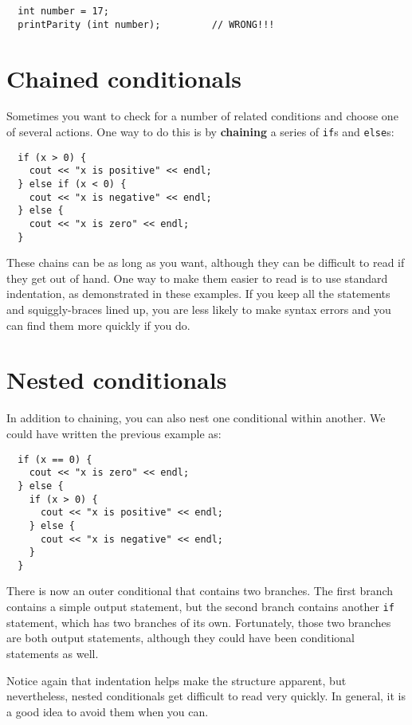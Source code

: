 \begin{verbatim}
  int number = 17;
  printParity (int number);         // WRONG!!!
\end{verbatim}

\section {Chained conditionals}

Sometimes you want to check for a number of related conditions
and choose one of several actions.  One way to do this is by
{\bf chaining} a series of {\tt if}s and {\tt else}s:

\begin{verbatim}
  if (x > 0) {
    cout << "x is positive" << endl;
  } else if (x < 0) {
    cout << "x is negative" << endl;
  } else {
    cout << "x is zero" << endl;
  }
\end{verbatim}
%
These chains can be as long as you want, although they can
be difficult to read if they get out of hand.  One way to
make them easier to read is to use standard indentation,
as demonstrated in these examples.  If you keep all the
statements and squiggly-braces lined up, you are less
likely to make syntax errors and you can find them more
quickly if you do.

\section{Nested conditionals}

In addition to chaining, you can also nest one conditional
within another.  We could have written the previous example
as:

\begin{verbatim}
  if (x == 0) {
    cout << "x is zero" << endl;
  } else {
    if (x > 0) {
      cout << "x is positive" << endl;
    } else {
      cout << "x is negative" << endl;
    }
  }
\end{verbatim}
%
There is now an outer conditional that contains two branches.  The
first branch contains a simple output statement, but the second
branch contains another {\tt if} statement, which has two branches
of its own.  Fortunately, those two branches are both output
statements, although they could have been conditional statements as
well.

Notice again that indentation helps make the structure
apparent, but nevertheless, nested conditionals get difficult to read
very quickly.  In general, it is a good idea to avoid them when you
can.

